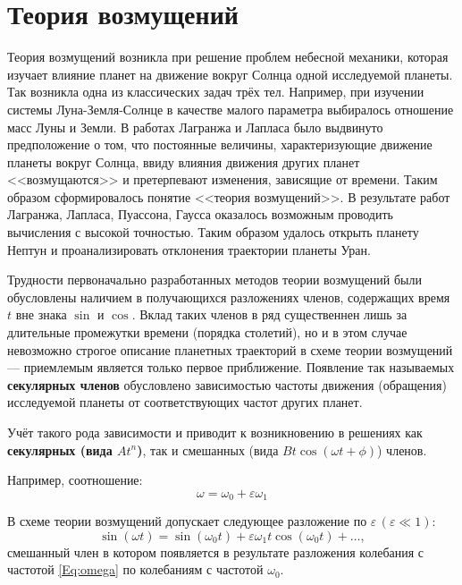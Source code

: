 \chapter*{Теория возмущений}

Теория возмущений возникла при решение
проблем небесной механики,
которая изучает влияние планет
на движение вокруг Солнца одной исследуемой планеты.
Так возникла одна из классических задач трёх тел.
Например, при изучении системы Луна-Земля-Солнце
в качестве малого параметра выбиралось
отношение масс Луны и Земли.
В работах Лагранжа и Лапласа было
выдвинуто предположение о том,
что постоянные величины,
характеризующие движение планеты вокруг Солнца,
ввиду влияния движения других планет <<возмущаются>>
и претерпевают изменения, зависящие от времени.
Таким образом сформировалось понятие <<теория возмущений>>.
В результате работ Лагранжа, Лапласа, Пуассона, Гаусса
оказалось возможным проводить вычисления с высокой точностью.
Таким образом удалось открыть планету Нептун
и проанализировать отклонения траектории планеты Уран.

Трудности первоначально разработанных методов теории возмущений
были обусловлены наличием в получающихся разложениях членов,
содержащих время $t$ вне знака $\sin$ и $\cos$.
Вклад таких членов в ряд существеннен лишь
за длительные промежутки времени (порядка столетий),
но и в этом случае невозможно строгое описание планетных
траекторий в схеме теории возмущений ---
приемлемым является только первое приближение.
Появление так называемых \textbf{секулярных членов}
обусловлено зависимостью частоты движения (обращения)
исследуемой планеты от соответствующих частот других планет.

Учёт такого рода зависимости и
приводит к возникновению в решениях
как \textbf{секулярных (вида $A t^n$)},
так и смешанных (вида $B t \cos(\omega t + \phi)$) членов.

Например, соотношение:
\begin{equation} \label{Eq:omega}
    \omega = \omega_0 + \varepsilon \omega_1 
\end{equation}

В схеме теории возмущений допускает
следующее разложение по $\varepsilon \, (\varepsilon \ll 1)$:
\begin{equation*}
    \sin(\omega t) = \sin(\omega_0 t) +
    \varepsilon \omega_1 t \cos(\omega_0 t) + \dots,
\end{equation*}
смешанный член в котором появляется в результате разложения
колебания с частотой \eqref{Eq:omega}
по колебаниям с частотой $\omega_0$.
